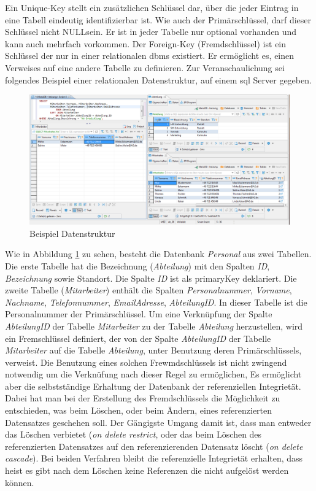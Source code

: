 Ein Unique-Key stellt ein zusätzlichen Schlüssel dar, über die jeder Eintrag in eine Tabell eindeutig identifizierbar ist.
Wie auch der Primärschlüssel, darf dieser Schlüssel nicht \flqq NULL\frqq{}sein.
Er ist in jeder Tabelle nur optional vorhanden und kann auch mehrfach vorkommen.
Der Foreign-Key (Fremdschlüssel) ist ein Schlüssel der nur in einer relationalen \ac{dbms} existiert.
Er ermöglicht es, einen Verweises auf eine andere Tabelle zu definieren.
Zur Veranschaulichung sei folgendes Beispiel einer relationalen Datenstruktur,
auf einem \ac{sql} Server gegeben.
\begin{figure}[hbt]
  \centering
  \includegraphics[width=\textwidth]{content/hauptteil/theoretischeGrundlagen/rec/exampleSQL.png}
\caption{Beispiel Datenstruktur}
 \label{fig:exampleSQLStructure}%
\end{figure}
Wie in Abbildung \ref{fig:exampleSQLStructure} zu sehen, besteht die Datenbank \emph{Personal} aus zwei Tabellen.
Die erste Tabelle hat die Bezeichnung (\emph{Abteilung}) mit den Spalten \emph{ID}, \emph{Bezeichnung} sowie Standort.
Die Spalte \emph{ID} ist als primaryKey deklariert.
Die zweite Tabelle (\emph{Mitarbeiter}) enthält die Spalten 
\emph{Personalnummer}, \emph{Vorname}, \emph{Nachname}, \emph{Telefonnummer}, \emph{EmailAdresse}, \emph{AbteilungID}.
In dieser Tabelle ist die Personalnummer der Primärschlüssel.
Um eine Verknüpfung der Spalte \emph{AbteilungID} der Tabelle \emph{Mitarbeiter} zu der Tabelle \emph{Abteilung} herzustellen, 
wird ein Fremschlüssel definiert, der von der Spalte \emph{AbteilungID} der Tabelle \emph{Mitarbeiter} auf die Tabelle \emph{Abteilung}, 
unter Benutzung deren Primärschlüssels, verweist.
Die Benutzung eines solchen Frewmdschlüssels ist nicht zwingend notwendig um die Verknüfung nach dieser Regel zu ermöglichen,
Es ermöglicht aber die selbstständige Erhaltung der Datenbank der referenziellen Integrietät. 
Dabei hat man bei der Erstellung des Fremdschlüssels die Möglichkeit zu entschieden, was beim Löschen, oder beim Ändern, eines referenzierten Datensatzes geschehen soll.
Der Gängigste Umgang damit ist, dass man entweder das Löschen verbietet (\emph{on delete restrict},
oder das beim Löschen des referenzierten Datensatzes auf den referenzierenden Datensatz löscht (\emph{on delete cascade}).
Bei beiden Verfahren bleibt die referenzielle Integrietät erhalten, 
dass heist es gibt nach dem Löschen keine Referenzen die nicht aufgelöst werden können.

